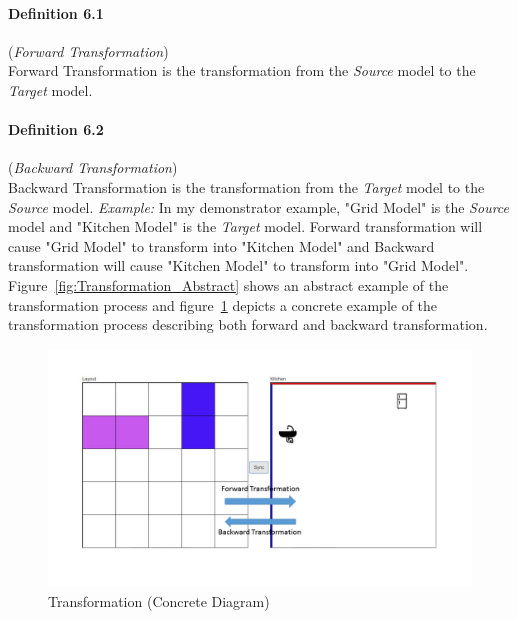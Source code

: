 \paragraph{Definition 6.1} (\textit{Forward Transformation})\\
Forward Transformation is the transformation from the \textit{Source} model to the \textit{Target} model.

\paragraph{Definition 6.2} (\textit{Backward Transformation})\\ 
Backward Transformation is the transformation from the \textit{Target} model to the \textit{Source} model.
\newline\newline\textit{Example:} In my demonstrator example, "Grid Model" is the \textit{Source} model and "Kitchen Model" is the \textit{Target} model. Forward transformation will cause "Grid Model" to transform into "Kitchen Model" and Backward transformation will cause "Kitchen Model" to transform into "Grid Model". Figure~\ref{fig:Transformation_Abstract} shows an abstract example of the transformation process and figure~\ref{fig:Transformation_Concrete} depicts a concrete example of the transformation process describing both forward and backward transformation.

\begin{figure}
	\includegraphics[width=1\textwidth]{figures/Transformation_Concrete}
	\caption{Transformation (Concrete Diagram)}
	\label{fig:Transformation_Concrete}
\end{figure}


